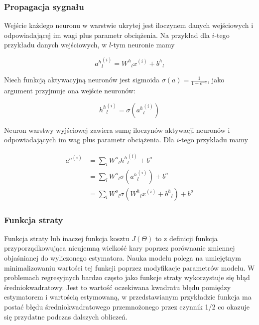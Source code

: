 \documentclass[11pt]{book}
\theoremstyle{definition}
\begin{document}
\subsubsection{Propagacja sygnału}

Wejście każdego neuronu w warstwie ukrytej jest iloczynem danych wejściowych i odpowiadającej im wagi plus parametr obciążenia. Na przykład dla $i$-tego przykładu danych wejściowych, w $l$-tym neuronie mamy

\begin{equation}
{a^h}^{(i)}_l = {W^h}_{l}x^{(i)} + {b^h}_l
\end{equation}




Niech funkcją aktywacyjną neuronów jest sigmoida $\sigma(a) = \frac{1}{1+e^{-a}}$, jako argument przyjmuje ona wejście neuronów:

\begin{equation}
{h^h}^{(i)}_l=\sigma({a^h}^{(i)}_l)
\end{equation}


Neuron warstwy wyjściowej zawiera sumę iloczynów aktywacji neuronów i odpowiadających im wag plus parametr obciążenia. Dla $i$-tego przykładu mamy

\begin{equation}
\begin{split}
{a^o}^{(i)} &= \sum_{l} {W^o}_l{h^h}^{(i)}_l + {b^o} \\
& = \sum_{l} {W^o}_l\sigma({a^h}^{(i)}_l) + {b^o} \\
& = \sum_{l} {W^o}_l\sigma({W^h}_{l}x^{(i)} + {b^h}_l) + {b^o}
\end{split}
\end{equation}

\subsubsection{Funkcja straty}

Funkcja straty lub inaczej funkcja kosztu $J(\Theta)$ to z definicji funkcja przyporządkowująca nieujemną wielkość kary poprzez porównanie zmiennej objaśnianej do wyliczonego estymatora. Nauka modelu polega na umiejętnym minimalizowaniu wartości tej funkcji poprzez modyfikacje parametrów modelu. W problemach regresyjnych bardzo często jako funkcje straty wykorzystuje się błąd średniokwadratowy. Jest to wartość oczekiwana kwadratu błędu pomiędzy estymatorem i wartością estymowaną, w przedstawianym przykładzie funkcja ma postać błędu średniokwadratowego przemnożonego przez czynnik 1/2 co okazuje się przydatne podczas dalszych obliczeń.
\end{document}
